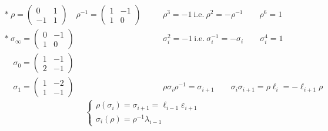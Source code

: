 \documentclass[11pt,a4paper]{article}
\begin{document}
\[
\begin{aligned}
&{*}\ \rho = \begin{pmatrix} 0 & 1 \\ -1 & 1 \end{pmatrix} \quad \rho^{-1} = \begin{pmatrix} 1 & -1 \\ 1 & 0 \end{pmatrix}
&\quad& \rho^3 = -1 \ \text{i.e.}\ \rho^2 = -\rho^{-1} \qquad \rho^6 = 1 \\
&{*}\ \sigma_\infty = \begin{pmatrix} 0 & -1 \\ 1 & 0 \end{pmatrix} && \sigma_i^2 = -1 \ \text{i.e.}\ \sigma_i^{-1} = -\sigma_i \qquad \sigma_i^4 = 1 \\
&\phantom{*}\ \sigma_0 = \begin{pmatrix} 1 & -1 \\ 2 & -1 \end{pmatrix} \\
&\phantom{*}\ \sigma_1 = \begin{pmatrix} 1 & -2 \\ 1 & -1 \end{pmatrix} && \rho\sigma_i\rho^{-1} = \sigma_{i+1} \qquad \sigma_i\sigma_{i+1} = \rho\ell_i = -\ell_{i+1}\rho
\end{aligned}
\]
\[
\begin{cases}
\rho(\sigma_i) = \sigma_{i+1} = \ell_{i-1}\varepsilon_{i+1} \\
\sigma_i(\rho) = \rho^{-1}\lambda_{i-1}
\end{cases}
\]
\end{document}
